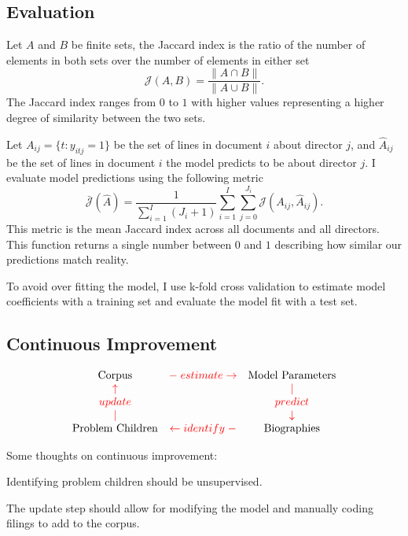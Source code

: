 \documentclass{article}
\newcommand{\1}{\mathds{1}}
\newcommand{\red}[1]{{\color{red}#1}}
\begin{document}
\begin{verbatim}
\end{verbatim}

\subsection{Evaluation}

Let $A$ and $B$ be finite sets, the Jaccard index is the ratio of
the number of elements in both sets over the number of elements in
either set
\[
\mathcal{J}(A, B) = \frac{ \| A \cap B \| }{ \| A \cup B \| }.
\]
The Jaccard index ranges from $0$ to $1$ with higher values
representing a higher degree of similarity between the two sets.

Let $A_{ij} = \{ t : y_{itj} = 1 \}$ be the set of lines in document
$i$ about director $j$, and $\hat{A}_{ij}$ be the set of lines in
document $i$ the model predicts to be about director $j$. I evaluate
model predictions using the following metric
\[
\bar{\mathcal{J}}(\hat{A}) = \frac{1}{\sum_{i = 1}^I (J_i + 1)} \sum_{i = 1}^I \sum_{j = 0}^{J_i} \mathcal{J}(A_{ij}, \hat{A}_{ij}).
\]
This metric is the mean Jaccard index across all documents and all
directors. This function returns a single number between $0$ and $1$
describing how similar our predictions match reality.

To avoid over fitting the model, I use k-fold cross validation to
estimate model coefficients with a training set and evaluate the model
fit with a test set.

\subsection{Continuous Improvement}

\[
\begin{array}[c]{ccc}
\text{Corpus} & \red{-\; estimate \rightarrow} & \text{Model Parameters} \\
\red{\uparrow} & & \red{|} \\
\red{update} & & \red{predict} \\
\red{|} & & \red{\downarrow}\\
\text{Problem Children} & \red{\leftarrow identify \;-} & \text{Biographies}
\end{array}
\]

Some thoughts on continuous improvement:

Identifying problem children should be unsupervised.

The update step should allow for modifying the model and manually
coding filings to add to the corpus.
\end{document}
